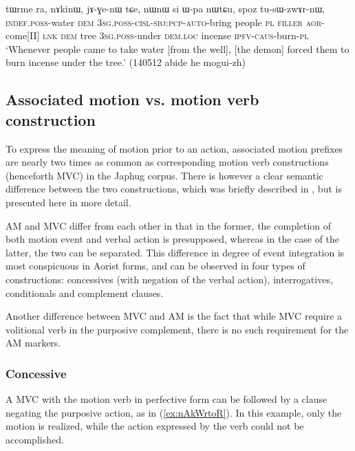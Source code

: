 \begin{exe}
\ex \label{ex:tWci.WGWkWnWru}
\gll [tɯ-ci nɯnɯ ɯ-ɣɯ-kɯ-nɯ-ru] tɯrme ra, nɤkinɯ, jɤ-ɣe-nɯ tɕe, nɯnɯ si ɯ-pa nɯtɕu, spoz tu-sɯ-zwɤr-nɯ, \\
\textsc{indef}.\textsc{poss}-water \textsc{dem} \textsc{3sg}.\textsc{poss}-\textsc{cisl}-\textsc{sbj}:\textsc{pcp}-\textsc{auto}-bring people \textsc{pl} \textsc{filler} \textsc{aor}-come[II] \textsc{lnk} \textsc{dem} tree \textsc{3sg}.\textsc{poss}-under \textsc{dem}.\textsc{loc} incense \textsc{ipfv}-\textsc{caus}-burn-\textsc{pl} \\
\glt `Whenever people came to take water [from the well], [the demon] forced them to burn incense under the tree.' (140512 abide he mogui-zh)
\end{exe}

\subsection{Associated motion vs. motion verb construction} \label{sec:am.vs.mvc}
To express the meaning of motion prior to an action, associated motion prefixes are nearly two times as common as corresponding motion verb constructions (henceforth MVC) in the Japhug corpus. There is however a clear semantic difference between the two constructions, which was briefly described in \citet{jacques13harmonization}, but is presented here in more detail.

AM and MVC differ from each other in that in the former, the completion of both motion event and verbal action is presupposed, whereas in the case of the latter, the two can be separated. This difference in degree of event integration is most conspicuous in Aorist forms, and can be observed in four types of constructions: concessives (with negation of the verbal action), interrogatives, conditionals and complement clauses. 

Another difference between MVC and AM is the fact that while MVC require a volitional verb in the purposive complement, there is no such requirement for the AM markers.

\subsubsection{Concessive} \label{sec:am.concessive}
A MVC  with the motion verb in perfective form can be followed by a clause negating the purposive action, as in (\ref{ex:nAkWrtoR}). In this example, only the motion is realized, while the action expressed by the verb  could not be accomplished.

